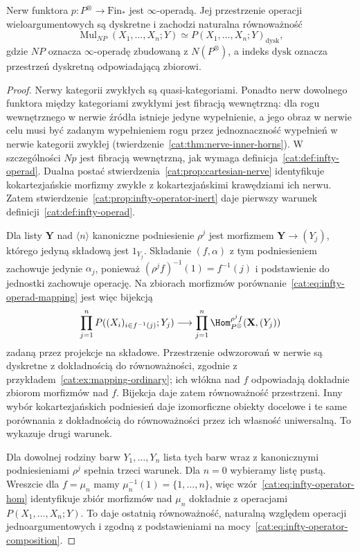 \begin{twierdzenie}\label{cat:thm:infty-operad-classical-nerve}
Nerw funktora $p:P^\otimes\to\mathrm{Fin}_*$ jest $\infty$-operadą. Jej przestrzenie operacji wieloargumentowych są dyskretne i zachodzi naturalna równoważność
\[
 \operatorname{Mul}_{NP}(X_1,\ldots,X_n;Y)
 \simeq P(X_1,\ldots,X_n;Y)_{\mathrm{dysk}},
\]
gdzie $NP$ oznacza $\infty$-operadę zbudowaną z $N(P^\otimes)$, a indeks $\mathrm{dysk}$ oznacza przestrzeń dyskretną odpowiadającą zbiorowi.
\end{twierdzenie}
\begin{proof}
Nerwy kategorii zwykłych są quasi-kategoriami. Ponadto nerw dowolnego funktora między kategoriami zwykłymi jest fibracją wewnętrzną: dla rogu wewnętrznego w nerwie źródła istnieje jedyne wypełnienie, a jego obraz w nerwie celu musi być zadanym wypełnieniem rogu przez jednoznaczność wypełnień w nerwie kategorii zwykłej (twierdzenie~\ref{cat:thm:nerve-inner-horns}). W szczególności $Np$ jest fibracją wewnętrzną, jak wymaga definicja~\ref{cat:def:infty-operad}. Dualna postać stwierdzenia~\ref{cat:prop:cartesian-nerve} identyfikuje kokartezjańskie morfizmy zwykłe z kokartezjańskimi krawędziami ich nerwu. Zatem stwierdzenie~\ref{cat:prop:infty-operator-inert} daje pierwszy warunek definicji~\ref{cat:def:infty-operad}.

Dla listy $\mathbf Y$ nad $\langle n\rangle$ kanoniczne podniesienie $\rho^j$ jest morfizmem $\mathbf Y\to(Y_j)$, którego jedyną składową jest $1_{Y_j}$. Składanie $(f,\alpha)$ z tym podniesieniem zachowuje jedynie $\alpha_j$, ponieważ $(\rho^j f)^{-1}(1)=f^{-1}(j)$ i podstawienie do jednostki zachowuje operację. Na zbiorach morfizmów porównanie~\eqref{cat:eq:infty-operad-mapping} jest więc bijekcją
\[
 \prod_{j=1}^n P((X_i)_{i\in f^{-1}(j)};Y_j)
 \longrightarrow
 \prod_{j=1}^n\Hom^{\rho^j f}_{P^\otimes}(\mathbf X,(Y_j))
\]
zadaną przez projekcje na składowe. Przestrzenie odwzorowań w nerwie są dyskretne z dokładnością do równoważności, zgodnie z przykładem~\ref{cat:ex:mapping-ordinary}; ich włókna nad $f$ odpowiadają dokładnie zbiorom morfizmów nad $f$. Bijekcja daje zatem równoważność przestrzeni. Inny wybór kokartezjańskich podniesień daje izomorficzne obiekty docelowe i te same porównania z dokładnością do równoważności przez ich własność uniwersalną. To wykazuje drugi warunek.

Dla dowolnej rodziny barw $Y_1,\ldots,Y_n$ lista tych barw wraz z kanonicznymi podniesieniami $\rho^j$ spełnia trzeci warunek. Dla $n=0$ wybieramy listę pustą. Wreszcie dla $f=\mu_n$ mamy $\mu_n^{-1}(1)=\{1,\ldots,n\}$, więc wzór~\eqref{cat:eq:infty-operator-hom} identyfikuje zbiór morfizmów nad $\mu_n$ dokładnie z operacjami $P(X_1,\ldots,X_n;Y)$. To daje ostatnią równoważność, naturalną względem operacji jednoargumentowych i zgodną z podstawieniami na mocy~\eqref{cat:eq:infty-operator-composition}.
\end{proof}

